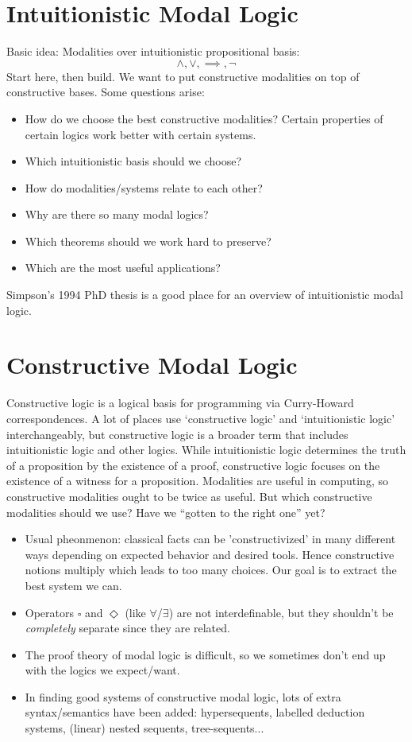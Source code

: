 \documentclass[11pt]{article}
\begin{document}
\section{Intuitionistic Modal Logic}

Basic idea: Modalities over intuitionistic propositional basis: \[\land, \lor, \implies, \lnot\]
Start here, then build. We want to put constructive modalities on top of constructive bases. Some questions arise:

\begin{itemize}
    \item How do we choose the best constructive modalities? Certain properties of certain logics work better with certain systems.
    \item Which intuitionistic basis should we choose?
    \item How do modalities/systems relate to each other?
    \item Why are there so many modal logics?
    \item Which theorems should we work hard to preserve?
    \item Which are the most useful applications?
\end{itemize}

Simpson's 1994 PhD thesis is a good place for an overview of intuitionistic modal logic\cite{Simpson1994ThePT}.

\section{Constructive Modal Logic}
Constructive logic is a logical basis for programming via Curry-Howard correspondences. 
A lot of places use `constructive logic' and `intuitionistic logic' interchangeably, but constructive logic is a broader term that includes intuitionistic logic and other logics.
While intuitionistic logic determines the truth of a proposition by the existence of a proof, constructive logic focuses on the existence of a witness for a proposition\cite{Pfenning2017ConstructiveLogic}.
Modalities are useful in computing, so constructive modalities ought to be twice as useful. But which constructive modalities should we use? Have we ``gotten to the right one'' yet?
\begin{itemize}
    \item Usual pheonmenon: classical facts can be 'constructivized' in many different ways depending on expected behavior and desired tools. Hence constructive notions multiply which leads to too many choices. Our goal is to extract the best system we can.
    \item Operators $\square$ and $\Diamond$ (like $\forall$/$\exists$) are not interdefinable, but they shouldn't be \textit{completely} separate since they are related.
    \item The proof theory of modal logic is difficult, so we sometimes don't end up with the logics we expect/want.
    \item In finding good systems of constructive modal logic, lots of extra syntax/semantics have been added: hypersequents, labelled deduction systems, (linear) nested sequents, tree-sequents...
\end{itemize}
\end{document}
